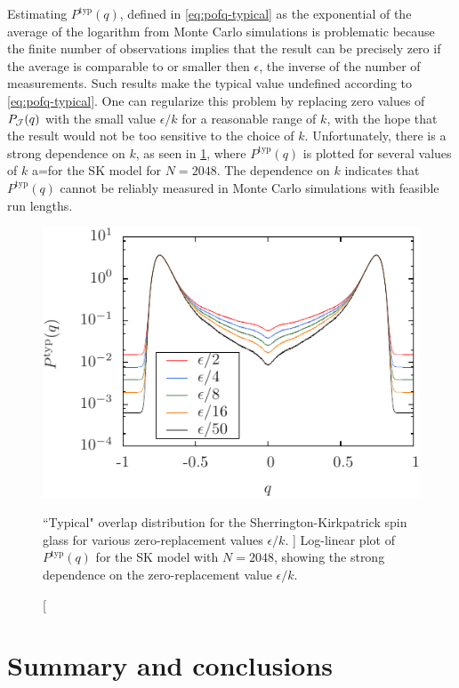Estimating $P^{\mathrm{typ}}(q)$, defined in \cref{eq:pofq-typical} as the
exponential of the average of the logarithm from Monte Carlo simulations is
problematic because the finite number of observations implies that the result
can be precisely zero if the average is comparable to or smaller then
$\epsilon$, the inverse of the number of measurements. Such results make the
typical value undefined according to \cref{eq:pofq-typical}. One can regularize
this problem by replacing zero values of $P_{\mathcal{J}}(q)$ with the small value
$\epsilon/k$ for a reasonable range of $k$, with the hope that the result would
not be too sensitive to the choice of $k$. Unfortunately, there is a strong
dependence on $k$, as seen in \cref{fig:pofq-typical-sk}, where
$P^{\mathrm{typ}}(q)$ is plotted for several values of $k$ a=for the SK model
for $N=2048$. The dependence on $k$ indicates that $P^{\mathrm{typ}}(q)$ cannot
be reliably measured in Monte Carlo simulations with feasible run lengths.

\begin{figure}
  \centering
  \includegraphics{import/EP}
  \caption
  [
    ``Typical" overlap distribution for the Sherrington-Kirkpatrick spin glass
    for various zero-replacement values $\epsilon/k$.
  ]
  {
    Log-linear plot of $P^{\mathrm{typ}}(q)$ for the SK model with $N=2048$,
    showing the strong dependence on the zero-replacement value $\epsilon/k$.
  }
  \label{fig:pofq-typical-sk}
\end{figure}


\section{Summary and conclusions}

